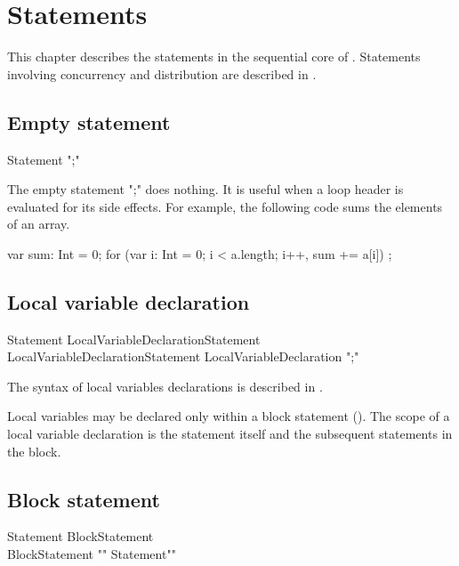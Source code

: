 \chapter{Statements}\label{XtenStatements}

This chapter describes the statements in the sequential core of
\Xten{}.  Statements involving concurrency and distribution
are described in .

\section{Empty statement}

\begin{grammar}
Statement \: \xcd";" \\
\end{grammar}

The empty statement \xcd";" does nothing.  It is useful when a
loop header is evaluated for its side effects.  For example,
the following code sums the elements of an array.
\begin{xten}
var sum: Int = 0;
for (var i: Int = 0; i < a.length; i++, sum += a[i])
    ;
\end{xten}

\section{Local variable declaration}

\begin{grammar}
Statement \: LocalVariableDeclarationStatement \\
             LocalVariableDeclarationStatement \:
             LocalVariableDeclaration \xcd";" \\
\end{grammar}

The syntax of local variables declarations is described in
.

Local variables may be declared only within a block statement
().
The scope of a local variable declaration is the 
statement itself and the subsequent statements in the block.

\section{Block statement}
\label{Blocks}

\begin{grammar}
Statement \: BlockStatement \\
BlockStatement \: \xcd"{" Statement\star \xcd"}" \\
\end{grammar}

